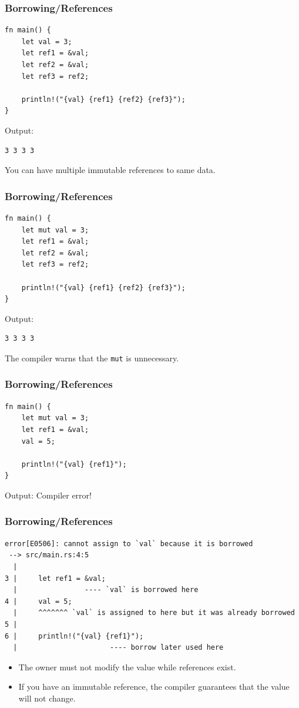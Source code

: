 \begin{frame}[fragile]
    \frametitle{Borrowing/References}
    \begin{verbatim}
fn main() {
    let val = 3;
    let ref1 = &val;
    let ref2 = &val;
    let ref3 = ref2;

    println!("{val} {ref1} {ref2} {ref3}");
}
    \end{verbatim}
    \pause
    \vfill
    Output:
    \pause
    \vfill
    \begin{verbatim}
3 3 3 3
    \end{verbatim}
    \pause
    \vfill
    You can have multiple immutable references to same data.
\end{frame}

\begin{frame}[fragile]
    \frametitle{Borrowing/References}
    \begin{verbatim}
fn main() {
    let mut val = 3;
    let ref1 = &val;
    let ref2 = &val;
    let ref3 = ref2;

    println!("{val} {ref1} {ref2} {ref3}");
}
    \end{verbatim}
    \pause
    \vfill
    Output:
    \pause
    \vfill
    \begin{verbatim}
3 3 3 3
    \end{verbatim}
    \pause
    \vfill
    The compiler warns that the \texttt{mut} is unnecessary.
\end{frame}

\begin{frame}[fragile]
    \frametitle{Borrowing/References}
    \begin{verbatim}
fn main() {
    let mut val = 3;
    let ref1 = &val;
    val = 5;

    println!("{val} {ref1}");
}
    \end{verbatim}
    \pause
    \vfill
    Output:
    \pause
    \vfill
    Compiler error!
\end{frame}

\begin{frame}[fragile]
    \frametitle{Borrowing/References}
    \begin{verbatim}
error[E0506]: cannot assign to `val` because it is borrowed
 --> src/main.rs:4:5
  |
3 |     let ref1 = &val;
  |                ---- `val` is borrowed here
4 |     val = 5;
  |     ^^^^^^^ `val` is assigned to here but it was already borrowed
5 |
6 |     println!("{val} {ref1}");
  |                      ---- borrow later used here
    \end{verbatim}
    \pause
    \vfill
    \begin{itemize}
        \item The owner must not modify the value while references exist.
        \pause
        \item If you have an immutable reference, the compiler guarantees that the value will not change.
    \end{itemize}
\end{frame}

